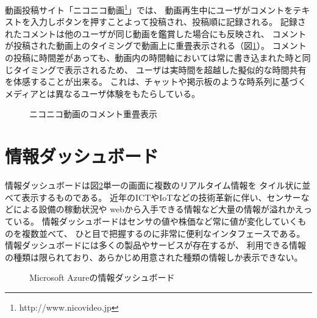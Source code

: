動画投稿サイト「ニコニコ動画\footnote{http://www.nicovideo.jp}」では、
動画再生中にユーザがコメントをテキストを入力しボタンを押すことよって投稿され、投稿順に記録される。
記録されたコメントは他のユーザが同じ動画を鑑賞した場合にも反映され、
コメントが投稿された動画上のタイミングで動画上に重畳表示される（図\ref{niconico}）。
コメントの投稿に時間差があっても、動画内の時間軸においては常に書き込まれた時と同じタイミングで表示されるため、
ユーザは実時間を超越した擬似的な時間共有を体感することが出来る。
これは、チャットや掲示板のような時系列に基づくメディアとは異なるユーザ体験をもたらしている\cite{110006793374}。

\begin{figure}[H]
\centering
{}
\caption{ニコニコ動画のコメント重畳表示}
\label{niconico}
\end{figure}


\section{情報ダッシュボード}

情報ダッシュボードは図\ref{azure}単一の画面に複数のリアルタイム情報を
タイル状に並べて表示するものである\cite{few}\cite{few2005}。
近年のICTやIoTなどの技術革新に伴い、センサーなどによる設備の稼動状況や
webから入手できる情報など大量の情報が溢れかえっている。
情報ダッシュボードはセンサの値や株価など常に値が変化していくものを複数並べて、
ひと目で把握するのに非常に便利なインタフェースである。
情報ダッシュボードには多くの製品やサービスが存在するが、
利用できる情報の種類は限られており、あらかじめ用意された種類の情報しか表示できない。

\begin{figure}[H]
\centering
{}
\caption{Microsoft Azureの情報ダッシュボード}
\label{azure}
\end{figure}